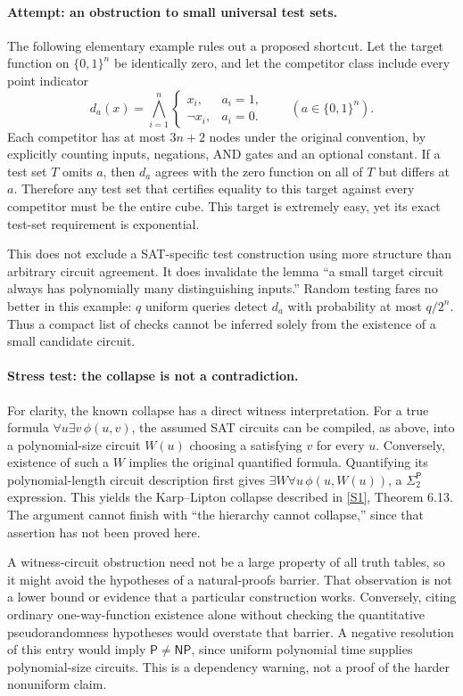 \documentclass[11pt,a4paper]{article}
\newcommand{\sref}[2]{\hyperlink{source:#1:#2}{[S#2]}}
\begin{document}
\paragraph{Attempt: an obstruction to small universal test sets.}
The following elementary example rules out a proposed shortcut. Let the
target function on $\{0,1\}^n$ be identically zero, and let the competitor
class include every point indicator
\[
 d_a(x)=\bigwedge_{i=1}^n
 \begin{cases}x_i,&a_i=1,\\ \neg x_i,&a_i=0.\end{cases}
 \qquad(a\in\{0,1\}^n).
\]
Each competitor has at most $3n+2$ nodes under the original convention,
by explicitly counting inputs, negations, AND gates and an optional
constant. If a test set $T$ omits $a$, then $d_a$ agrees with the zero
function on all of $T$ but differs at $a$. Therefore any test set that
certifies equality to this target against every competitor must be the
entire cube. This target is extremely easy, yet its exact test-set
requirement is exponential.

This does not exclude a SAT-specific test construction using more
structure than arbitrary circuit agreement. It does invalidate the
lemma ``a small target circuit always has polynomially many distinguishing
inputs.'' Random testing fares no better in this example: $q$ uniform
queries detect $d_a$ with probability at most $q/2^n$. Thus a compact
list of checks cannot be inferred solely from the existence of a small
candidate circuit.

\paragraph{Stress test: the collapse is not a contradiction.}
For clarity, the known collapse has a direct witness interpretation.
For a true formula $\forall u\exists v\,\phi(u,v)$, the assumed SAT
circuits can be compiled, as above, into a polynomial-size circuit
$W(u)$ choosing a satisfying $v$ for every $u$. Conversely, existence of
such a $W$ implies the original quantified formula. Quantifying its
polynomial-length circuit description first gives
$\exists W\forall u\,\phi(u,W(u))$, a $\Sigma_2^{\mathsf P}$ expression.
This yields the Karp--Lipton collapse described in \sref{statement}{1},
Theorem 6.13. The argument cannot finish with ``the hierarchy cannot
collapse,'' since that assertion has not been proved here.

A witness-circuit obstruction need not be a large property of all truth
tables, so it might avoid the hypotheses of a natural-proofs barrier.
That observation is not a lower bound or evidence that a particular
construction works. Conversely, citing ordinary one-way-function
existence alone without checking the quantitative pseudorandomness
hypotheses would overstate that barrier. A negative resolution of this
entry would imply $\mathsf P\ne\mathsf{NP}$, since uniform polynomial
time supplies polynomial-size circuits. This is a dependency warning,
not a proof of the harder nonuniform claim.
\end{document}
